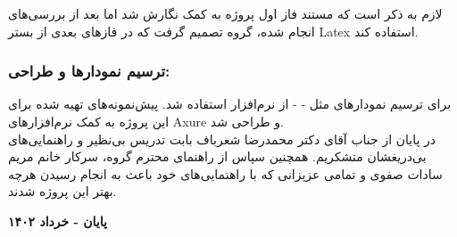 \documentclass[12pt]{article}
\begin{document}
لازم به ذکر است که مستند فاز اول پروژه به کمک
 نگارش شد اما بعد از بررسی‌های انجام شده، گروه تصمیم گرفت که در فازهای بعدی از بستر Latex استفاده کند.

	\subsubsection{ترسیم نمودارها و طراحی:‫‬‬}
	برای ترسیم نمودارهای مثل
	- 
	- 
	از نرم‌افزار
	 استفاده شد.
	پیش‌نمونه‌های تهیه شده برای این پروژه به کمک نرم‌افزار‌‌های
	Axure
	و
	 طراحی شد.
	\\

	در پایان از جناب آقای دکتر محمدرضا شعرباف بابت تدریس بی‌نظیر و راهنمایی‌های بی‌دریغشان متشکریم. همچنین سپاس از راهنمای محترم گروه، سرکار خانم مریم سادات صفوی و تمامی عزیزانی که با راهنمایی‌های خود باعث به انجام رسیدن هرچه بهتر این پروژه شدند.
	\begin{flushleft}
		\textbf{پایان - خرداد ۱۴۰۲}
	\end{flushleft}
\end{document}
